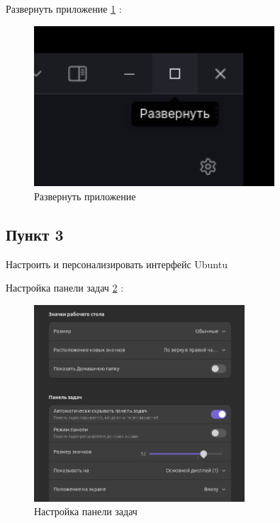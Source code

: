 Развернуть приложение \ref{fig:unroll} :

\begin{figure}[!h]
    \centering
    \includegraphics[width = 0.8\textwidth]{images/unroll.png}
    
    \caption{Развернуть приложение}
    
    \label{fig:unroll}
\end{figure}

\subsection{Пункт 3}

Настроить и персонализировать интерфейс Ubuntu

Настройка панели задач \ref{fig:settingUbuntu1} :

\begin{figure}[!h]
    \centering
    \includegraphics[width = 0.7\textwidth]{images/settingUbuntu1.png}
    
    \caption{Настройка панели задач}
    
    \label{fig:settingUbuntu1}
\end{figure}

